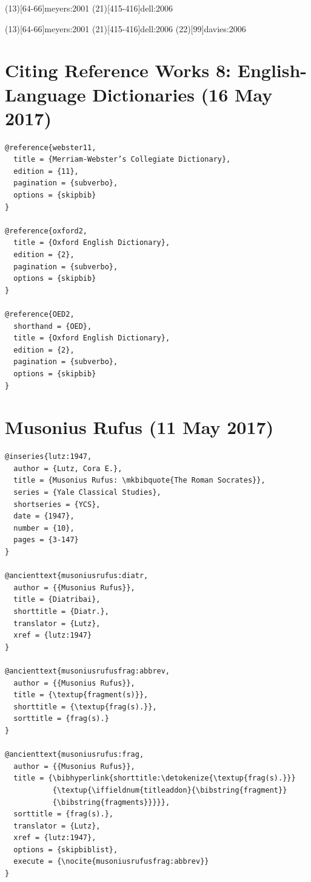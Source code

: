 \documentclass[a4paper]{article}
\begin{document}
\examplecite(13)[64-66]{meyers:2001}
\examplecite(21)[415-416]{dell:2006}
\citereset
\begin{verbtext}
  \usepackage[style=sbl,citepages=separate]{biblatex}
\end{verbtext}
\makeatletter
{\cbx@opt@citepages@separate
 \examplecite(13)[64-66]{meyers:2001}
}
\makeatother
\examplecite(21)[415-416]{dell:2006}
\examplecite(22)[99]{davies:2006}
\examplebibliography
{}

\section{Citing Reference Works 8: English-Language Dictionaries (16 May 2017)}

\begin{verbatim}
@reference{webster11,
  title = {Merriam-Webster’s Collegiate Dictionary},
  edition = {11},
  pagination = {subverbo},
  options = {skipbib}
}

@reference{oxford2,
  title = {Oxford English Dictionary},
  edition = {2},
  pagination = {subverbo},
  options = {skipbib}
}

@reference{OED2,
  shorthand = {OED},
  title = {Oxford English Dictionary},
  edition = {2},
  pagination = {subverbo},
  options = {skipbib}
}
\end{verbatim}

\exampleabbreviations
{}

\section{Musonius Rufus (11 May 2017)}

\begin{verbatim}
@inseries{lutz:1947,
  author = {Lutz, Cora E.},
  title = {Musonius Rufus: \mkbibquote{The Roman Socrates}},
  series = {Yale Classical Studies},
  shortseries = {YCS},
  date = {1947},
  number = {10},
  pages = {3-147}
}

@ancienttext{musoniusrufus:diatr,
  author = {{Musonius Rufus}},
  title = {Diatribai},
  shorttitle = {Diatr.},
  translator = {Lutz},
  xref = {lutz:1947}
}

@ancienttext{musoniusrufusfrag:abbrev,
  author = {{Musonius Rufus}},
  title = {\textup{fragment(s)}},
  shorttitle = {\textup{frag(s).}},
  sorttitle = {frag(s).}
}

@ancienttext{musoniusrufus:frag,
  author = {{Musonius Rufus}},
  title = {\bibhyperlink{shorttitle:\detokenize{\textup{frag(s).}}}
           {\textup{\iffieldnum{titleaddon}{\bibstring{fragment}}
           {\bibstring{fragments}}}}},
  sorttitle = {frag(s).},
  translator = {Lutz},
  xref = {lutz:1947},
  options = {skipbiblist},
  execute = {\nocite{musoniusrufusfrag:abbrev}}
}
\end{verbatim}
\end{document}
